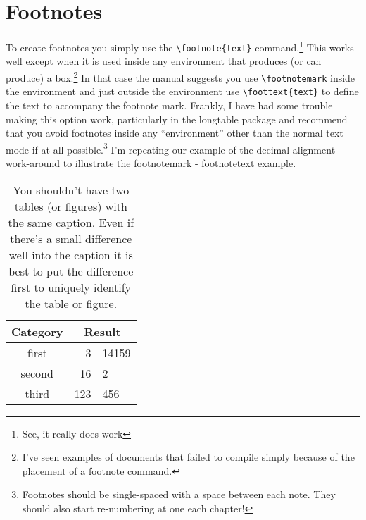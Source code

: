 \section{Footnotes}
To create footnotes you simply use the \verb=\footnote{text}= command.\footnote{See, it really does work} This works well except when it is used inside any environment that produces (or can produce) a box.\footnote{I've seen examples of documents that failed to compile simply because of the placement of a footnote command.} In that case the manual suggests you use \verb=\footnotemark= inside the environment and just outside the environment use \verb=\foottext{text}= to define the text to accompany the footnote mark. \citep{Boek97} Frankly, I have had some trouble making this option work, particularly in the longtable package and recommend that you avoid footnotes inside any ``environment'' other than the normal text mode if at all possible.\footnote{Footnotes should be single-spaced with a space between each note. They should also start re-numbering at one each chapter!} I'm repeating our example of the decimal alignment work-around to illustrate the footnotemark - footnotetext example.


\begin{table}[h!]
\caption[This is an example of an optional caption - this will appear in the list of tables - the caption in curly brackets will appear with the table]{You shouldn't have two tables (or figures) with the same caption. Even if there's a small difference well into the caption it is best to put the difference first to uniquely identify the table or figure.}\label{tb3}
  \begin{tabular}{c r@{.}l}
 \hline
 Category & \multicolumn{2}{c}{Result}\\
 \hline
  first & 3&14159\footnotemark\\
  second & 16&2\\
  third & 123&456\\
  \hline
  \end{tabular}
\end{table}
